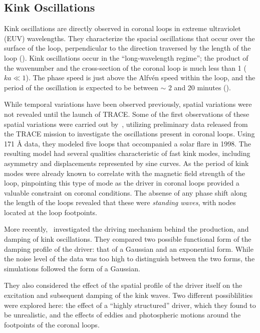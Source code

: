 \documentclass[preprint2]{aastex}
\begin{document}
\subsection{Kink Oscillations}
Kink oscillations are directly observed in coronal loops in extreme
ultraviolet (EUV) wavelengths.
They characterize the spacial oscillations that occur over the surface of
the loop, perpendicular to the direction traversed by the length
of the loop (\cite{Nak}).
Kink oscillations occur in the ``long-wavelength regime'';
the product of the wavenumber and the cross-section of the coronal
loop is much less than 1 ($ka \ll 1$). The phase speed is just above
the Alfv\'en speed within the loop, and the period of the oscillation
is expected to be between $\sim$ 2 and 20 minutes
(\cite{Asc}).

While temporal variations have been observed previously,
spatial variations were not revealed until the launch of
TRACE\@.
Some of the first observations of these spatial variations
were carried out by~\cite{kink_1},
utilizing preliminary data released from the TRACE mission
to investigate the oscillations present in coronal loops.
Using 171 \AA{} data, they modeled five loops
that occompanied a solar flare in 1998.
The resulting model had several qualities characteristic of
fast kink modes, including asymmetry and
displacements represented by sine curves.
As the period of kink modes were already known to correlate
with the magnetic field strength of the loop, pinpointing this
type of mode as the driver in coronal loops provided a valuable
constraint on coronal conditions.
The absense of any phase
shift along the length of the loops revealed that these were
\emph{standing waves}, with nodes located at the loop footpoints.

More recently,~\cite{kink_2} investigated the driving mechanism
behind the production, and damping of kink oscillations.
They compared two possible functional form of the damping profile
of the driver: that of a Gaussian and an exponential form.
While the noise level of the data was too high to distinguish
between the two forms, the simulations followed the form of a
Gaussian.

They also considered the effect of the spatial profile of the driver
itself on the excitation and subsequent damping of the kink
waves. Two different possiblilities were explored here:
the effect of a ``highly structured'' driver, which they
found to be unrealistic, and the effects of eddies and photospheric
motions around the footpoints of the coronal loops.
\end{document}
